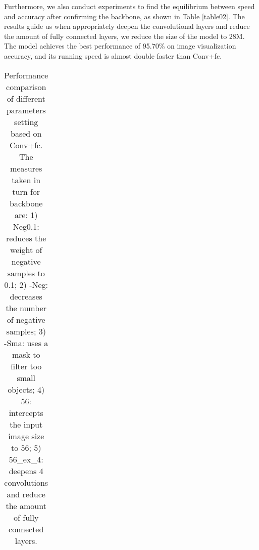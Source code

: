 \documentclass{article}
\begin{document}
Furthermore, we also conduct experiments to find the equilibrium between speed and accuracy after confirming the backbone, as shown in Table \ref{table02}. The results guide us when appropriately deepen the convolutional layers and reduce the amount of fully connected layers, we reduce the size of the model to 28M. The model achieves the best performance of 95.70\% on image visualization accuracy, and its running speed is almost double faster than Conv+fc.
% 
\begin{table}[!h]
\setlength{\tabcolsep}{3pt}
\small
\caption{Performance comparison of different parameters setting based on Conv+fc. The measures taken in turn for backbone are: 1) Neg0.1: reduces the weight of negative samples to 0.1; 2) -Neg: decreases the number of negative samples; 3) -Sma: uses a mask to filter too small objects; 4) 56: intercepts the input image size to 56; 5) 56\_ex\_4: deepens 4 convolutions and reduce the amount of fully connected layers.}
\begin{tabular}{@{}lcccc@{}}


\end{tabular}
\end{table}
\end{document}
